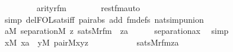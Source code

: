 \begin{isabellebody}
\ \ \ \ \isanewline
\ \ \ \ {\isachardoublequoteopen}arity{\isacharparenleft}{\kern0pt}rfm{\isacharparenleft}{\kern0pt}{}{\isacharcomma}{\kern0pt}{}{\isacharparenright}{\kern0pt}{\isacharparenright}{\kern0pt}\ {\isacharequal}{\kern0pt}\ {}{\isachardoublequoteclose}\isanewline
\ \ \ \ \isamarkupfalse%
\ rest{\isacharunderscore}{\kern0pt}fm{\isacharunderscore}{\kern0pt}auto\ \isamarkupfalse%
\ {\isacharparenleft}{\kern0pt}simp\ del{\isacharcolon}{\kern0pt}FOL{\isacharunderscore}{\kern0pt}sats{\isacharunderscore}{\kern0pt}iff\ pair{\isacharunderscore}{\kern0pt}abs\ add{\isacharcolon}{\kern0pt}\ fm{\isacharunderscore}{\kern0pt}defs\ nat{\isacharunderscore}{\kern0pt}simp{\isacharunderscore}{\kern0pt}union{\isacharparenright}{\kern0pt}\isanewline
\ \ \isamarkupfalse%
\isanewline
\ \ \isamarkupfalse%
\ {\isachardoublequoteopen}{\isasymforall}a{\isasymin}M{\isachardot}{\kern0pt}\ separation{\isacharparenleft}{\kern0pt}{\isacharhash}{\kern0pt}{\isacharhash}{\kern0pt}M{\isacharcomma}{\kern0pt}\ {\isasymlambda}z{\isachardot}{\kern0pt}\ sats{\isacharparenleft}{\kern0pt}M{\isacharcomma}{\kern0pt}rfm{\isacharparenleft}{\kern0pt}{}{\isacharcomma}{\kern0pt}{}{\isacharparenright}{\kern0pt}\ {\isacharcomma}{\kern0pt}\ {\isacharbrackleft}{\kern0pt}z{\isacharcomma}{\kern0pt}a{\isacharbrackright}{\kern0pt}{\isacharparenright}{\kern0pt}{\isacharparenright}{\kern0pt}{\isachardoublequoteclose}\isanewline
\ \ \ \ \isamarkupfalse%
\ separation{\isacharunderscore}{\kern0pt}ax\ \isamarkupfalse%
\ simp\isanewline
\ \ \isamarkupfalse%
\isanewline
\ \ \isamarkupfalse%
\ {\isachardoublequoteopen}{\isacharparenleft}{\kern0pt}{\isasymexists}x{\isasymin}M{\isachardot}{\kern0pt}\ x{\isasymin}a\ {\isacharampersand}{\kern0pt}\ {\isacharparenleft}{\kern0pt}{\isasymexists}y{\isasymin}M{\isachardot}{\kern0pt}\ pair{\isacharparenleft}{\kern0pt}{\isacharhash}{\kern0pt}{\isacharhash}{\kern0pt}M{\isacharcomma}{\kern0pt}x{\isacharcomma}{\kern0pt}y{\isacharcomma}{\kern0pt}z{\isacharparenright}{\kern0pt}{\isacharparenright}{\kern0pt}{\isacharparenright}{\kern0pt}\ {\isasymlongleftrightarrow}\isanewline
\ \ \ \ \ \ \ \ \ \ sats{\isacharparenleft}{\kern0pt}M{\isacharcomma}{\kern0pt}rfm{\isacharparenleft}{\kern0pt}{}{\isacharcomma}{\kern0pt}{}{\isacharparenright}{\kern0pt}{\isacharcomma}{\kern0pt}{\isacharbrackleft}{\kern0pt}z{\isacharcomma}{\kern0pt}a{\isacharbrackright}{\kern0pt}{\isacharparenright}{\kern0pt}{\isachardoublequoteclose}\isanewline

\end{isabellebody}
